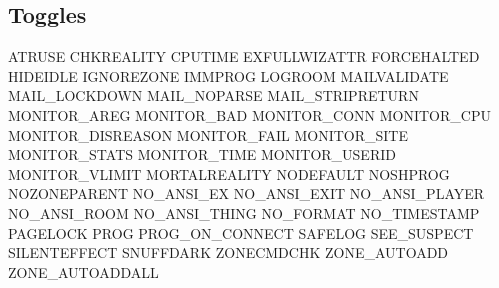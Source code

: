 \documentclass[letterpaper,10pt,english]{sphinxmanual}
\begin{document}
\subsection{Toggles}
\label{\detokenize{differences:toggles}}
\sphinxAtStartPar
ATRUSE                       CHKREALITY                    CPUTIME
EXFULLWIZATTR                FORCEHALTED                   HIDEIDLE
IGNOREZONE                   IMMPROG                       LOGROOM
MAILVALIDATE                 MAIL\_LOCKDOWN                 MAIL\_NOPARSE
MAIL\_STRIPRETURN             MONITOR\_AREG                  MONITOR\_BAD
MONITOR\_CONN                 MONITOR\_CPU                   MONITOR\_DISREASON
MONITOR\_FAIL                 MONITOR\_SITE                  MONITOR\_STATS
MONITOR\_TIME                 MONITOR\_USERID                MONITOR\_VLIMIT
MORTALREALITY                NODEFAULT                     NOSHPROG
NOZONEPARENT                 NO\_ANSI\_EX                    NO\_ANSI\_EXIT
NO\_ANSI\_PLAYER               NO\_ANSI\_ROOM                  NO\_ANSI\_THING
NO\_FORMAT                    NO\_TIMESTAMP                  PAGELOCK
PROG                         PROG\_ON\_CONNECT               SAFELOG
SEE\_SUSPECT                  SILENTEFFECT                  SNUFFDARK
ZONECMDCHK                   ZONE\_AUTOADD                  ZONE\_AUTOADDALL
\end{document}
